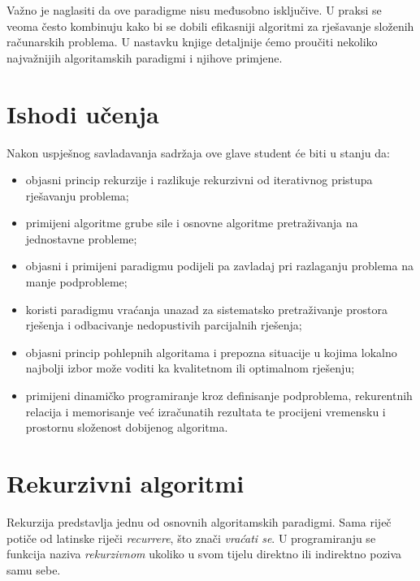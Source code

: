 Važno je naglasiti da ove paradigme nisu međusobno isključive. U praksi se veoma često kombinuju kako bi se dobili efikasniji algoritmi za rješavanje složenih računarskih problema. U nastavku knjige detaljnije ćemo proučiti nekoliko najvažnijih algoritamskih paradigmi i njihove primjene.\\

\section*{Ishodi učenja}

Nakon uspješnog savladavanja sadržaja ove glave student će biti u stanju da:

\begin{itemize}
	\item objasni princip rekurzije i razlikuje rekurzivni od iterativnog pristupa rješavanju problema;
	
	\item primijeni algoritme grube sile i osnovne algoritme pretraživanja	na jednostavne probleme;
	
	\item objasni i primijeni paradigmu podijeli pa zavladaj pri razlaganju problema na manje podprobleme;
	
	\item koristi paradigmu vraćanja unazad za sistematsko pretraživanje prostora rješenja i odbacivanje nedopustivih parcijalnih rješenja;
	
	\item objasni princip pohlepnih algoritama i prepozna situacije u kojima lokalno najbolji izbor može voditi ka kvalitetnom ili optimalnom rješenju;
	
	\item primijeni dinamičko programiranje kroz definisanje podproblema,
	rekurentnih relacija i memorisanje već izračunatih rezultata te procijeni
	vremensku i prostornu složenost dobijenog algoritma.
\end{itemize}



\section{Rekurzivni algoritmi}

Rekurzija predstavlja jednu od osnovnih algoritamskih paradigmi. Sama riječ potiče od latinske riječi \textit{recurrere}, što znači \emph{vraćati se}. U programiranju se funkcija naziva \textit{rekurzivnom} ukoliko u svom tijelu direktno ili indirektno poziva samu sebe.

